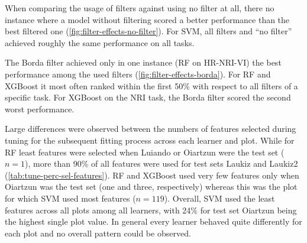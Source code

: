 \documentclass[journal]{IEEEtran}
\begin{document}
When comparing the usage of filters against using no filter at all, there no instance where a model without filtering scored a better performance than the best filtered one (\autoref{fig:filter-effects-no-filter}).
For SVM, all filters and \enquote{no filter} achieved roughly the same performance on all tasks.

The Borda filter achieved only in one instance (RF on HR-NRI-VI) the best performance among the used filters (\autoref{fig:filter-effects-borda}).
For RF and XGBoost it most often ranked within the first 50\% with respect to all filters of a specific task.
For XGBoost on the NRI task, the Borda filter scored the second worst performance.

Large differences were observed between the numbers of features selected during tuning for the subsequent fitting process across each learner and plot.
While for RF least features were selected when Luiando or Oiartzun were the test set ($n = 1$), more than 90\% of all features were used for test sets Laukiz and Laukiz2 (\autoref{tab:tune-perc-sel-features}).
RF and XGBoost used very few features only when Oiartzun was the test set (one and three, respectively) whereas this was the plot for which SVM used most features ($n = 119$).
Overall, SVM used the least features across all plots among all learners, with 24\% for test set Oiartzun being the highest single plot value.
In general every learner behaved quite differently for each plot and no overall pattern could be observed.










\end{document}
